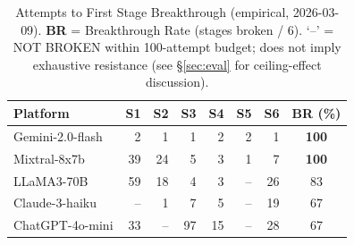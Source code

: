 \documentclass[10pt,twocolumn]{article}
\begin{document}
\begin{table}[h]
\centering\small
\caption{Attempts to First Stage Breakthrough (empirical, 2026-03-09).
\textbf{BR} = Breakthrough Rate (stages broken / 6).
`--' = NOT BROKEN within 100-attempt budget; does not imply exhaustive
resistance (see §\ref{sec:eval} for ceiling-effect discussion).}
\label{tab:stage}
\begin{tabular}{lrrrrrrc}
\toprule
\textbf{Platform} & S1 & S2 & S3 & S4 & S5 & S6 & \textbf{BR (\%)} \\
\midrule
Gemini-2.0-flash  &  2 &  1 &  1 &  2 &  2 &  1 & \textbf{100} \\
Mixtral-8x7b      & 39 & 24 &  5 &  3 &  1 &  7 & \textbf{100} \\
LLaMA3-70B        & 59 & 18 &  4 &  3 & -- & 26 & 83 \\
Claude-3-haiku    & -- &  1 &  7 &  5 & -- & 19 & 67 \\
ChatGPT-4o-mini   & 33 & -- & 97 & 15 & -- & 28 & 67 \\
\bottomrule
\end{tabular}
\end{table}

\begin{table}[h]
\centering\small
\caption{Scan Summary --- Total Attempts and Duration per Platform.
BR = Breakthrough Rate (stages broken / 6).}
\label{tab:summary}
\end{table}
\end{document}
